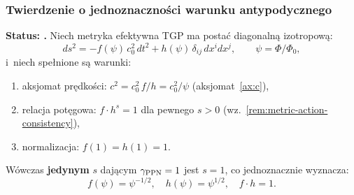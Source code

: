 \subsubsection{Twierdzenie o jednoznaczno\'sci warunku antypodycznego}%
\label{sssec:antipodal-uniqueness}

\begin{theorem}%
\label{thm:antipodal-uniqueness}
\textbf{Status: .}
Niech metryka efektywna TGP ma posta\'c diagonaln\k{a} izotropow\k{a}:
\begin{equation}
  ds^2 = -f(\psi)\,c_0^2\,dt^2 + h(\psi)\,\delta_{ij}\,dx^i dx^j,
  \qquad \psi = \Phi/\Phi_0,
  \label{eq:antipodal-metric-ansatz}
\end{equation}
i~niech spe\l{}nione s\k{a} warunki:
\begin{enumerate}[nosep]
  \item[(C1)] aksjomat pr\k{e}dko\'sci: $c^2 = c_0^2\,f/h = c_0^2/\psi$
    (aksjomat~\ref{ax:c}),
  \item[(C2)] relacja pot\k{e}gowa: $f\cdot h^s = 1$ dla pewnego $s > 0$
    (wz.~\ref{rem:metric-action-consistency}),
  \item[(C3)] normalizacja: $f(1) = h(1) = 1$.
\end{enumerate}
W\'owczas \textbf{jedynym} $s$ daj\k{a}cym
$\gamma_{\rm PPN} = 1$ jest $s = 1$, co jednoznacznie
wyznacza:
\begin{equation}
  \boxed{f(\psi) = \psi^{-1/2},
  \quad h(\psi) = \psi^{1/2},
  \quad f \cdot h = 1.}
  \label{eq:antipodal-unique-solution}
\end{equation}
\end{theorem}

